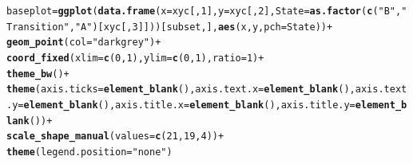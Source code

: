 \documentclass{article}\usepackage[]{graphicx}\usepackage[]{color}
\makeatletter
\newcommand{\hlnum}[1]{\textcolor[rgb]{0.686,0.059,0.569}{#1}}%
\newcommand{\hlstr}[1]{\textcolor[rgb]{0.192,0.494,0.8}{#1}}%
\newcommand{\hlopt}[1]{\textcolor[rgb]{0,0,0}{#1}}%
\newcommand{\hlstd}[1]{\textcolor[rgb]{0.345,0.345,0.345}{#1}}%
\newcommand{\hlkwb}[1]{\textcolor[rgb]{0.69,0.353,0.396}{#1}}%
\newcommand{\hlkwc}[1]{\textcolor[rgb]{0.333,0.667,0.333}{#1}}%
\newcommand{\hlkwd}[1]{\textcolor[rgb]{0.737,0.353,0.396}{\textbf{#1}}}%
\newenvironment{kframe}{%
 \def\at@end@of@kframe{}%
 \ifinner\ifhmode%
  \def\at@end@of@kframe{\end{minipage}}%
  \begin{minipage}{\columnwidth}%
 \fi\fi%
 \def\FrameCommand##1{\hskip\@totalleftmargin \hskip-\fboxsep
 \colorbox{shadecolor}{##1}\hskip-\fboxsep
     \hskip-\linewidth \hskip-\@totalleftmargin \hskip\columnwidth}%
 \MakeFramed {\advance\hsize-\width
   \@totalleftmargin\z@ \linewidth\hsize
   \@setminipage}}%
 {\par\unskip\endMakeFramed%
 \at@end@of@kframe}
\newenvironment{knitrout}{}{} %
\makeatother
\begin{document}
\begin{knitrout}
\color{fgcolor}\begin{kframe}
\begin{alltt}
\hlstd{baseplot} \hlkwb{=} \hlkwd{ggplot}\hlstd{(}\hlkwd{data.frame}\hlstd{(}\hlkwc{x} \hlstd{= xyc[,}\hlnum{1}\hlstd{],} \hlkwc{y} \hlstd{= xyc[,}\hlnum{2}\hlstd{],} \hlkwc{State} \hlstd{=} \hlkwd{as.factor}\hlstd{(}\hlkwd{c}\hlstd{(}\hlstr{"B"}\hlstd{,} \hlstr{"Transition"}\hlstd{,} \hlstr{"A"}\hlstd{)[xyc[,}\hlnum{3}\hlstd{]]))[subset,],} \hlkwd{aes}\hlstd{(x, y,} \hlkwc{pch} \hlstd{= State))} \hlopt{+}
        \hlkwd{geom_point}\hlstd{(}\hlkwc{col} \hlstd{=} \hlstr{"darkgrey"}\hlstd{)} \hlopt{+}
        \hlkwd{coord_fixed}\hlstd{(}\hlkwc{xlim} \hlstd{=} \hlkwd{c}\hlstd{(}\hlnum{0}\hlstd{,} \hlnum{1}\hlstd{),} \hlkwc{ylim} \hlstd{=} \hlkwd{c}\hlstd{(}\hlnum{0}\hlstd{,} \hlnum{1}\hlstd{),} \hlkwc{ratio} \hlstd{=} \hlnum{1}\hlstd{)} \hlopt{+}
        \hlkwd{theme_bw}\hlstd{()} \hlopt{+}
        \hlkwd{theme}\hlstd{(}\hlkwc{axis.ticks} \hlstd{=} \hlkwd{element_blank}\hlstd{(),} \hlkwc{axis.text.x} \hlstd{=} \hlkwd{element_blank}\hlstd{(),} \hlkwc{axis.text.y} \hlstd{=} \hlkwd{element_blank}\hlstd{(),} \hlkwc{axis.title.x} \hlstd{=} \hlkwd{element_blank}\hlstd{(),} \hlkwc{axis.title.y} \hlstd{=} \hlkwd{element_blank}\hlstd{())} \hlopt{+}
        \hlkwd{scale_shape_manual}\hlstd{(}\hlkwc{values} \hlstd{=} \hlkwd{c}\hlstd{(}\hlnum{21}\hlstd{,} \hlnum{19}\hlstd{,} \hlnum{4}\hlstd{))} \hlopt{+}
        \hlkwd{theme}\hlstd{(}\hlkwc{legend.position}\hlstd{=}\hlstr{"none"}\hlstd{)}



\end{alltt}
\end{kframe}
\end{knitrout}
\end{document}
